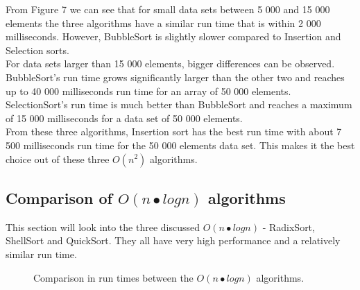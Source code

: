 \documentclass{acm_proc_article-sp}
\begin{document}
From Figure 7 we can see that for small data sets between 5 000 and 15 000 elements the three algorithms have a similar run time that is within 2 000 milliseconds. However, BubbleSort is slightly slower compared to Insertion and Selection sorts. \\
For data sets larger than 15 000 elements, bigger differences can be observed. BubbleSort's run time grows significantly larger than the other two and reaches up to 40 000 milliseconds run time for an array of 50 000 elements. SelectionSort's run time is much better than BubbleSort and reaches a maximum of 15 000 milliseconds for a data set of 50 000 elements.\\
From these three algorithms, Insertion sort has the best run time with about 7 500 milliseconds run time for the 50 000 elements data set. This makes it the best choice out of these three $O(n^{2})$ algorithms.


\subsection{Comparison of $O(n•logn)$ algorithms}
This section will look into the three discussed $O(n•logn)$ - RadixSort, ShellSort and QuickSort. They all have very high performance and a relatively similar run time.

\begin{figure}[!htb]
\caption{Comparison in run times between the $O(n•logn)$ algorithms.}
\end{figure}
\end{document}
